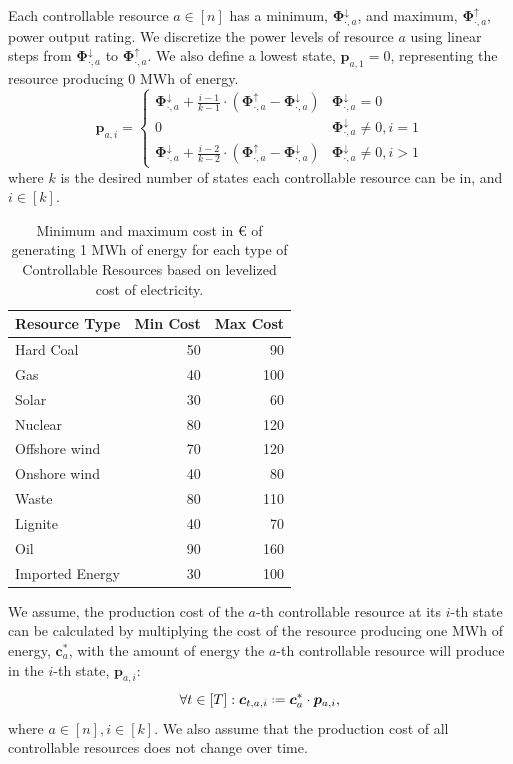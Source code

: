 \documentclass[conference]{IEEEtran}
\newcommand{\bp}{\boldsymbol{p}}
\newcommand{\bc}{\boldsymbol{c}}
\newcommand{\indices}[1]{[#1]}
\newcommand{\g}[1]{#1}
\newcommand{\fmin}[1]{{#1^{\downarrow}}}
\newcommand{\fmax}[1]{{#1^{\uparrow}}}
\newcommand{\mat}[1]{\bm{#1}}
\newcommand*{\defeq}{\mathrel{\vcenter{\baselineskip0.5ex\lineskiplimit0pt\hbox{\scriptsize.}\hbox{\scriptsize.}}}%
	=}
\begin{document}
Each controllable resource $a\in\indices{n}$ has a minimum,
$\fmin{\g{\mat{\Phi}}_{\cdot,a}}$, and maximum,
$\fmax{\g{\mat{\Phi}}_{\cdot,a}}$, power output rating. We discretize
the power levels of resource $a$ using linear steps from
$\fmin{\g{\mat{\Phi}}_{\cdot,a}}$ to
$\fmax{\g{\mat{\Phi}}_{\cdot,a}}$. We also define a lowest state,
$\g{\bp}_{a,1}=0$, representing the resource producing 0 MWh of energy.
\begin{equation}
  \label{eq:30}
  \g{\bp}_{a,i} =
  \begin{cases}
    \fmin{\g{\mat{\Phi}}_{\cdot,a}} + \frac{i-1}{k - 1}\cdot
    (\fmax{\g{\mat{\Phi}}_{\cdot,a}} - \fmin{\g{\mat{\Phi}}_{\cdot,a}})
    & \fmin{\g{\mat{\Phi}}_{\cdot,a}} = 0\\
    0 & \fmin{\g{\mat{\Phi}}_{\cdot,a}} \neq 0, i = 1\\
    \fmin{\g{\mat{\Phi}}_{\cdot,a}} + \frac{i-2}{k - 2}\cdot
    (\fmax{\g{\mat{\Phi}}_{\cdot,a}} - \fmin{\g{\mat{\Phi}}_{\cdot,a}})
    & \fmin{\g{\mat{\Phi}}_{\cdot,a}} \neq 0, i > 1
  \end{cases}
\end{equation}
where $k$ is the desired number of states each controllable resource can
be in, and $i\in\indices{k}$. 
\begin{table}[t!]
  \centering
  \begin{tabular}{l r r}
    \toprule
    Resource Type & Min Cost & Max Cost \\
    \midrule
    Hard Coal       & 50 & 90  \\
    Gas             & 40 & 100 \\
    Solar           & 30 & 60  \\
    Nuclear         & 80 & 120 \\
    Offshore wind   & 70 & 120 \\
    Onshore wind    & 40 & 80  \\
    Waste           & 80 & 110 \\
    Lignite         & 40 & 70  \\
    Oil             & 90 & 160 \\
    Imported Energy & 30 & 100 \\
    \bottomrule
  \end{tabular}
  \caption{Minimum and maximum cost in € of generating 1 MWh of energy for each type of Controllable Resources based on levelized cost of electricity.}\label{tbl:cost}
\end{table}

We assume, the production cost of the $a$-th controllable resource at
its $i$-th state can be calculated by multiplying the cost of the
resource producing one MWh of energy, $\g{\bc}_{a}^{*}$, with the amount
of energy the $a$-th controllable resource will produce in the $i$-th
state, $\g{\bp}_{a,i}$:
\begin{equation}
  \label{eq:39}
  \forall t\in\indices{T}:
  \g{\bc}_{t,a,i} \defeq \g{\bc}_{a}^{*} \cdot \g{\bp}_{a,i},
\end{equation}
where $a\in\indices{n}, i\in\indices{k}$. We also assume that the
production cost of all controllable resources does not change over time.
\end{document}
